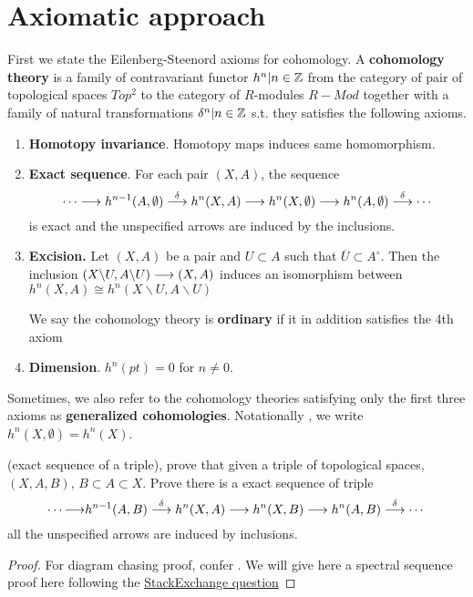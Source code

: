 \documentclass[11pt]{book} %
\begin{document}
\section{Axiomatic approach}
First we state the Eilenberg-Steenord axioms for cohomology. A \textbf{cohomology theory} is a family of contravariant functor $h^n|n\in \mathbb Z$ from the category of pair of topological spaces $Top^2$ to the category of $R$-modules $R-Mod$ together with a family of natural transformations $\delta^n|n\in\mathbb Z$ s.t. they satisfies the following axioms.
\begin{enumerate}[label=(\arabic*)]
\item \textbf{Homotopy invariance}. Homotopy maps induces same homomorphism.
\item \textbf{Exact sequence}. For each pair $(X,A)$, the sequence 
$$
\cdots\longrightarrow h^{n-1}(A,\emptyset)\overset{\delta}{\longrightarrow} h^n(X,A)\longrightarrow h^n(X,\emptyset)\longrightarrow h^n(A,\emptyset)\overset{\delta}{\longrightarrow}\cdots
$$
is exact and the unspecified arrows are induced by the inclusions.
\item \textbf{Excision.} Let $(X,A)$ be a pair and $U\subset A$ such that $\overline{U}\subset A^\circ$. Then the inclusion $(X\backslash U, A\backslash U)\longrightarrow (X,A)$ induces an isomorphism between $h^n(X,A)\cong h^n(X\backslash U,A\backslash U)$

We say the cohomology theory is \textbf{ordinary} if it in addition satisfies the 4th axiom
\item \textbf{Dimension}. $h^n(pt)=0$ for $n\neq 0$.
\end{enumerate}
Sometimes, we  also refer to the cohomology theories satisfying only the first three axioms as \textbf{generalized cohomologies}.
Notationally , we write $h^n(X,\emptyset )=h^n(X)$.

\begin{exr}
(exact sequence of a triple), prove that given a triple of topological spaces, $(X,A,B)$,  $B\subset A\subset X$. Prove there is a exact sequence of triple
$$
\cdots {\longrightarrow}{h^{n-1}(A,B)}\overset{\delta}{\longrightarrow} h^n(X,A)\longrightarrow h^n(X,B)\longrightarrow h^n(A,B)\overset{\delta}{\longrightarrow}\cdots
$$
all the unspecified arrows are induced by inclusions.
\end{exr}
\begin{proof}
For diagram chasing proof, confer  \cite[Chapter 4, section 8, theorem 5]{spanier1989algebraic}. We will give here a spectral sequence proof here following the \href{https://math.stackexchange.com/questions/1162917/long-exact-sequence-for-a-triple-follows-from-long-exact-sequence-for-a-pair}{StackExchange question}
\end{proof}
\end{document}
